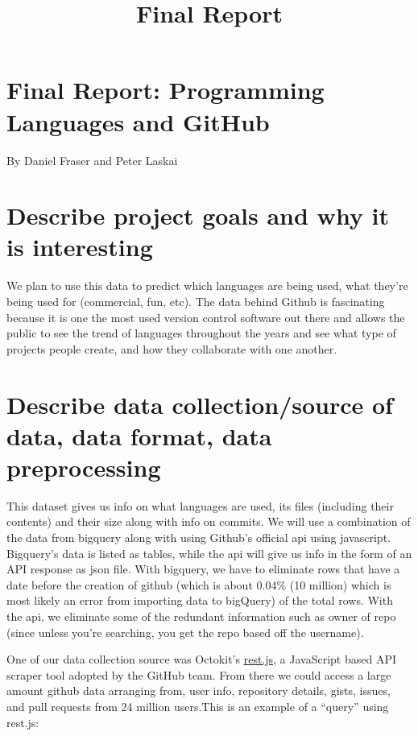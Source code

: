 \documentclass[11pt]{article}
\title{Final Report}
\begin{document}
    
    
    \maketitle
    
    

    
    \section{Final Report: Programming Languages and
GitHub}\label{final-report-programming-languages-and-github}

By Daniel Fraser and Peter Laskai

    \section{Describe project goals and why it is
interesting}\label{describe-project-goals-and-why-it-is-interesting}

We plan to use this data to predict which languages are being used, what
they're being used for (commercial, fun, etc). The data behind Github is
fascinating because it is one the most used version control software out
there and allows the public to see the trend of languages throughout the
years and see what type of projects people create, and how they
collaborate with one another.

    \section{Describe data collection/source of data, data format, data
preprocessing}\label{describe-data-collectionsource-of-data-data-format-data-preprocessing}

This dataset gives us info on what languages are used, its files
(including their contents) and their size along with info on commits. We
will use a combination of the data from bigquery along with using
Github's official api using javascript. Bigquery's data is listed as
tables, while the api will give us info in the form of an API response
as json file. With bigquery, we have to eliminate rows that have a date
before the creation of github (which is about 0.04\% (10 million) which
is most likely an error from importing data to bigQuery) of the total
rows. With the api, we eliminate some of the redundant information such
as owner of repo (since unless you're searching, you get the repo based
off the username).

One of our data collection source was Octokit's
\href{https://github.com/octokit/rest.js}{rest.js}, a JavaScript based
API scraper tool adopted by the GitHub team. From there we could access
a large amount github data arranging from, user info, repository
details, gists, issues, and pull requests from 24 million users.This is
an example of a ``query'' using rest.js:
\end{document}

